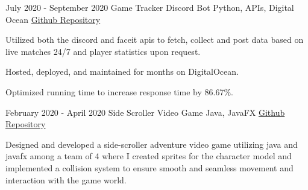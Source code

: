 \documentclass[]{awesome-cv}
\begin{document}
\begin{cventries}
	  \cventry
    {July 2020 - September 2020} 
    {Game Tracker Discord Bot}
    {Python, APIs, Digital Ocean} 
    {\href{https://github.com/krang-8/Game-Tracker}{Github Repository}} 
    {
      \begin{cvitems} %
        \item {Utilized both the discord and faceit apis to fetch, collect and post data based on live matches 24/7 and player statistics upon request.}
        \item {Hosted, deployed, and maintained for months on DigitalOcean.}
        \item {Optimized running time to increase response time by 86.67\%.}
      \end{cvitems}
    }


	
	
\cventry
	{February 2020 - April 2020}
	{Side Scroller Video Game}
	{Java, JavaFX}
	{\href{https://github.com/krang-8/Game-Project}{Github Repository}}
    {
      \begin{cvitems} %
        \item {Designed and developed a side-scroller adventure video game utilizing java and javafx among a team of 4 where I created sprites for the character model and implemented a collision system to ensure smooth and seamless movement and interaction with the game world. }
      \end{cvitems}
    }

\end{cventries}


\vspace{-4mm}
\end{document}
